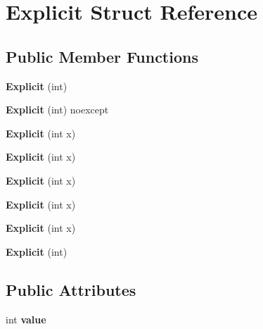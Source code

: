 \hypertarget{struct_explicit}{}\section{Explicit Struct Reference}
\label{struct_explicit}
\subsection*{Public Member Functions}
\begin{DoxyCompactItemize}
\item 
\mbox{\label{struct_explicit_a9934855271e04fb8885f713db7a5a9c1}} 
{\bfseries Explicit} (int)
\item 
\mbox{\label{struct_explicit_aa54b89d1d67aee3b190518210c80f87d}} 
{\bfseries Explicit} (int) noexcept
\item 
\mbox{\label{struct_explicit_ad6379d516884d4a1578653718ee93f82}} 
{\bfseries Explicit} (int x)
\item 
\mbox{\label{struct_explicit_ad6379d516884d4a1578653718ee93f82}} 
{\bfseries Explicit} (int x)
\item 
\mbox{\label{struct_explicit_ad6379d516884d4a1578653718ee93f82}} 
{\bfseries Explicit} (int x)
\item 
\mbox{\label{struct_explicit_ad6379d516884d4a1578653718ee93f82}} 
{\bfseries Explicit} (int x)
\item 
\mbox{\label{struct_explicit_ad6379d516884d4a1578653718ee93f82}} 
{\bfseries Explicit} (int x)
\item 
\mbox{\label{struct_explicit_a9934855271e04fb8885f713db7a5a9c1}} 
{\bfseries Explicit} (int)
\end{DoxyCompactItemize}
\subsection*{Public Attributes}
\begin{DoxyCompactItemize}
\item 
\mbox{\label{struct_explicit_af835699ca977478051aed2549d2e9392}} 
int {\bfseries value}
\end{DoxyCompactItemize}


